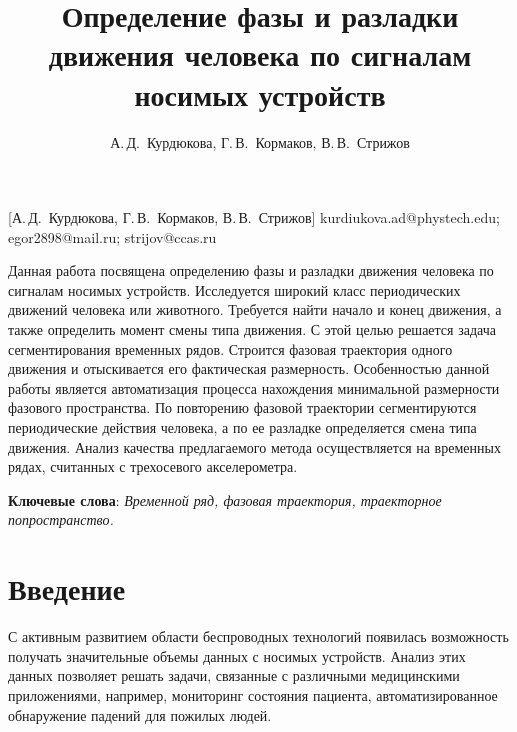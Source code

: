 \documentclass[12pt, twoside]{article}
\begin{document}
\title
    [] %
    {Определение фазы и разладки движения человека по сигналам носимых устройств}
\author
    [А.\,Д.~Курдюкова] %
    {А.\,Д.~Курдюкова, Г.\,В.~Кормаков, В.\,В.~Стрижов} %
    [А.\,Д.~Курдюкова, Г.\,В.~Кормаков, В.\,В.~Стрижов] %
\email
   {kurdiukova.ad@phystech.edu; egor2898@mail.ru; strijov@ccas.ru}
\abstract
  {Данная работа посвящена определению фазы и разладки движения человека по сигналам носимых устройств. Исследуется широкий класс периодических движений человека или животного. Требуется найти начало и конец движения, а также определить момент смены типа движения. С этой целью решается задача сегментирования временных рядов. Строится фазовая траектория одного движения и отыскивается его фактическая размерность. Особенностью данной работы является автоматизация процесса нахождения минимальной размерности фазового пространства. По повторению фазовой траектории сегментируются периодические действия человека, а по ее разладке определяется смена типа движения. Анализ качества предлагаемого метода осуществляется на временных рядах, считанных с трехосевого акселерометра.

\bigskip
\noindent
\textbf{Ключевые слова}: \emph {Временной ряд, фазовая траектория, траекторное попространство.}
}

\doi{}
\receivedRus{}
\receivedEng{}

\maketitle
\linenumbers

\section{Введение}
С активным развитием области беспроводных технологий появилась возможность получать значительные объемы данных с носимых устройств. Анализ этих данных позволяет решать задачи, связанные с различными медицинскими приложениями, например, мониторинг состояния пациента, автоматизированное обнаружение падений для пожилых людей.
\end{document}
